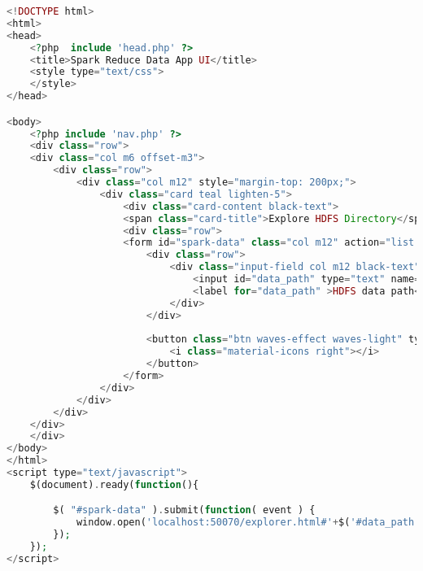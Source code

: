 \begin{lstlisting}[language=PHP, caption=view.php]
<!DOCTYPE html>
<html>
<head>
	<?php  include 'head.php' ?>
	<title>Spark Reduce Data App UI</title>
	<style type="text/css">
	</style>
</head>

<body>
	<?php include 'nav.php' ?>
	<div class="row">
	<div class="col m6 offset-m3">
		<div class="row">
		    <div class="col m12" style="margin-top: 200px;">
		      	<div class="card teal lighten-5">
		        	<div class="card-content black-text">
		          	<span class="card-title">Explore HDFS Directory</span>
		          	<div class="row">
				    <form id="spark-data" class="col m12" action="list.php" method="post">
				      	<div class="row">
				        	<div class="input-field col m12 black-text">
				          		<input id="data_path" type="text" name="data_path" class="validate">
				          		<label for="data_path" >HDFS data path</label>
				        	</div>
				        </div>
				  
				        <button class="btn waves-effect waves-light" type="submit" name="action">Submit
    						<i class="material-icons right"></i>
  						</button>
				    </form>
		      	</div>
		    </div>
		</div>   
	</div>
	</div>
</body>
</html>
<script type="text/javascript">
	$(document).ready(function(){

		$( "#spark-data" ).submit(function( event ) {
  			window.open('localhost:50070/explorer.html#'+$('#data_path').val(), '_blank');
		});
	});
</script>
\end{lstlisting}
